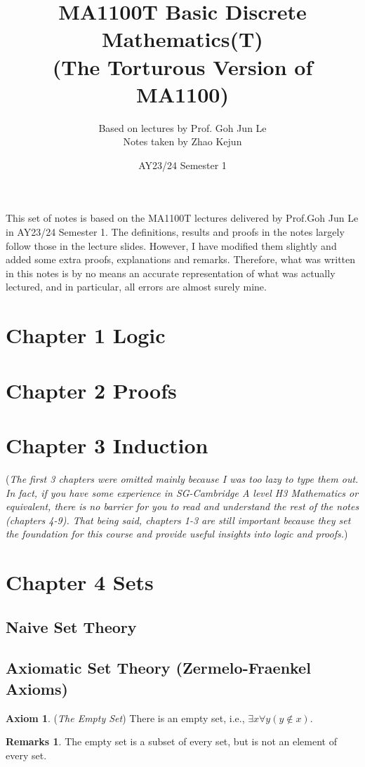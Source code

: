 \documentclass[14pt]{article}
\title{MA1100T Basic Discrete Mathematics(T)\\
    \large (The Torturous Version of MA1100)}
\author{Based on lectures by Prof. Goh Jun Le \\Notes taken by  Zhao Kejun}
\date{AY23/24 Semester 1}
\theoremstyle{definition}
\newtheorem*{remark}{Remarks}
\newtheorem{axiom}[definition]{Axiom}
\begin{document}
\maketitle

This set of notes is based on the MA1100T lectures delivered by Prof.Goh Jun Le in AY23/24 Semester
1. The definitions, results and proofs in the notes largely follow those in the lecture slides. However, I
have modified them slightly and added some extra proofs, explanations and remarks. Therefore, what was written in this notes is by no means an accurate representation of what was actually lectured, and in particular, all errors are almost surely mine.

\section{Chapter 1 Logic}

\section{Chapter 2 Proofs}

\section{Chapter 3 Induction}

(\textit{The first 3 chapters were omitted mainly because I was too lazy to type them out.
In fact, if you have some experience in SG-Cambridge A level H3 Mathematics or equivalent, 
there is no barrier for you to read and understand the rest of the notes (chapters
4-9). That being said,
chapters 1-3 are still important because they set the foundation for 
this course and provide useful insights into logic and proofs.})

\section{Chapter 4 Sets}
\subsection{Naive Set Theory}

\subsection{Axiomatic Set Theory (Zermelo-Fraenkel Axioms)}
\begin{axiom}
    (\textit{The Empty Set}) There is an empty set, i.e., $\exists x \forall y(y\notin x)$.
\end{axiom}
\begin{remark}
    The empty set is a subset of every set, but is not an element of every set.
\end{remark}
\end{document}
